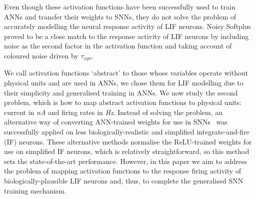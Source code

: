 \documentclass{article}
\begin{document}
Even though these activation functions have been successfully used to train ANNs and transfer their weights to SNNs, they do not solve the problem of accurately modelling the neural response activity of LIF neurons. %
Noisy Softplus~\cite{liu2016noisy} proved to be a close match to the response activity of LIF neurons by including noise as the second factor in the activation function and taking account of coloured noise driven by $\tau_{syn}$.

We call activation functions `abstract' to those whose variables operate without physical units and are used in ANNs, we chose them for LIF modelling due to their simplicity and generalised training in ANNs. 
We now study the second problem, which is how to map abstract activation functions to physical units: current in \textit{nA} and firing rates in \textit{Hz}.
Instead of solving the problem, an alternative way of converting ANN-trained weights for use in SNNs~\cite{cao2015spiking,diehl2015fast} was successfully applied on less biologically-realistic and simplified integrate-and-fire (IF) neurons.
These alternative methods normalise the ReLU-trained weights for use on simplified IF neurons, which is relatively straightforward, so this method sets the state-of-the-art performance.
However, in this paper we aim to address the problem of mapping activation functions to the response firing activity of biologically-plausible LIF neurons and, thus, to complete the generalised SNN training mechanism.


\end{document}
